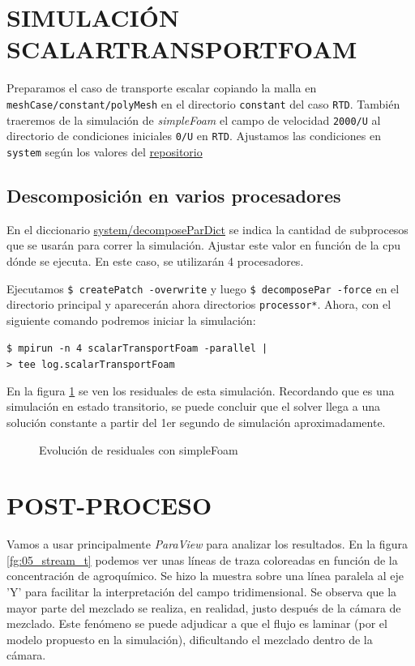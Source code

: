 \documentclass[oneside,a4paper,spanish,links]{amca}
\begin{document}
\section{SIMULACIÓN SCALARTRANSPORTFOAM}

Preparamos el caso de transporte escalar copiando la malla en \texttt{meshCase/constant/polyMesh} en el directorio \texttt{constant} del caso \texttt{RTD}. También traeremos de la simulación de \textit{simpleFoam} el campo de velocidad \texttt{2000/U} al directorio de condiciones iniciales \texttt{0/U} en \texttt{RTD}.
Ajustamos las condiciones en \texttt{system} según los valores del \href{https://github.com/guillerolle/casos_cfd/blob/master/03/RTD/system}{repositorio}

\subsection{Descomposición en varios procesadores}
En el diccionario \href{https://github.com/guillerolle/casos_cfd/blob/master/03/RTD/system/decomposeParDict}{system/decomposeParDict} se indica la cantidad de subprocesos que se usarán para correr la simulación. Ajustar este valor en función de la cpu dónde se ejecuta. En este caso, se utilizarán 4 procesadores.

Ejecutamos \texttt{\$ createPatch -overwrite} y luego \texttt{\$ decomposePar -force} en el directorio principal y aparecerán ahora directorios \texttt{processor*}. Ahora, con el siguiente comando podremos iniciar la simulación: \par 
\texttt{\$ mpirun -n 4 scalarTransportFoam -parallel | \\} 
\texttt{>  tee log.scalarTransportFoam}

En la figura \ref{fg:04_stf_res} se ven los residuales de esta simulación. Recordando que es una simulación en estado transitorio, se puede concluir que el solver llega a una solución constante a partir del 1er segundo de simulación aproximadamente.

\begin{figure}[htb]
	\caption{Evolución de residuales con simpleFoam} \label{fg:04_stf_res}
\end{figure}

\section{POST-PROCESO}

Vamos a usar principalmente \textit{ParaView} para analizar los resultados. En la figura \ref{fg:05_stream_t} podemos ver unas líneas de traza coloreadas en función de la concentración de agroquímico. Se hizo la muestra sobre una línea paralela al eje 'Y' para facilitar la interpretación del campo tridimensional. Se observa que la mayor parte del mezclado se realiza, en realidad, justo después de la cámara de mezclado. Este fenómeno se puede adjudicar a que el flujo es laminar (por el modelo propuesto en la simulación), dificultando el mezclado dentro de la cámara.
\end{document}
